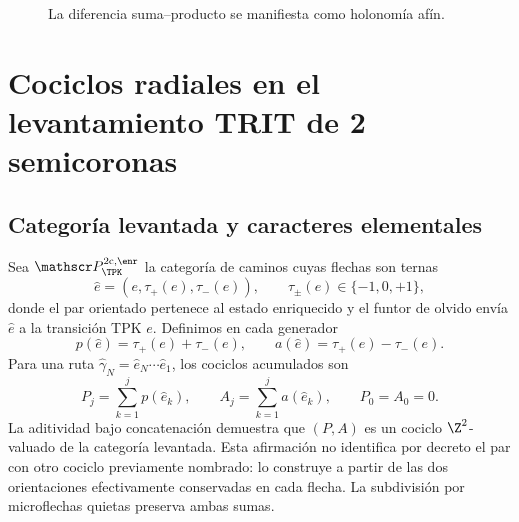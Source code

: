\begin{figure}[!htb]
\centering
{}
\caption{La diferencia suma--producto se manifiesta como holonomía afín.}
\label{espiral:fig:cuadrado-afin}
\end{figure}

\chapter{Cociclos radiales en el levantamiento TRIT de 2 semicoronas}
\label{espiral:chap:cociclos-radiales}

\section{Categoría levantada y caracteres elementales}

Sea \(\mathscr P_{\TPK}^{2\mathrm c,\enr}\) la categoría de caminos cuyas
flechas son ternas
\[
 \widehat e=(e,\tau_+(e),\tau_-(e)),
 \qquad \tau_\pm(e)\in\{-1,0,+1\},
\]
donde el par orientado pertenece al estado enriquecido y el funtor de olvido
envía \(\widehat e\) a la transición TPK \(e\). Definimos en cada generador
\begin{equation}
 p(\widehat e)=\tau_+(e)+\tau_-(e),
 \qquad
 a(\widehat e)=\tau_+(e)-\tau_-(e).
 \label{espiral:eq:carta-doble-trit}
\end{equation}
Para una ruta \(\widehat\gamma_N=\widehat e_N\cdots\widehat e_1\), los
cociclos acumulados son
\begin{equation}
 P_j=\sum_{k=1}^{j}p(\widehat e_k),
 \qquad
 A_j=\sum_{k=1}^{j}a(\widehat e_k),
 \qquad P_0=A_0=0.
 \label{espiral:eq:cociclos-radiales}
\end{equation}
La aditividad bajo concatenación demuestra que \((P,A)\) es un cociclo
\(\Z^2\)-valuado de la categoría levantada. Esta afirmación no identifica por
decreto el par con otro cociclo previamente nombrado: lo construye a partir
de las dos orientaciones efectivamente conservadas en cada flecha. La
subdivisión por microflechas quietas preserva ambas sumas.

